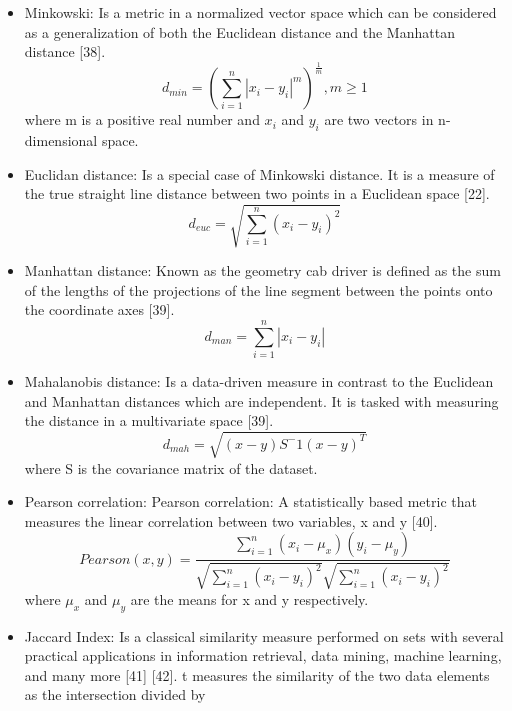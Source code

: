 \documentclass[
]{article}
\providecommand{\tightlist}{%
  \setlength{\itemsep}{0pt}\setlength{\parskip}{0pt}}
\begin{document}
\begin{itemize}
\tightlist
\item
  Minkowski: Is a metric in a normalized vector space which can be
  considered as a generalization of both the Euclidean distance and the
  Manhattan distance {[}38{]}. \begin{equation}
        d_{min} = (\sum_{i=1}^{n}|x_i - y_i|^m)^\frac{1}{m}, m\geq 1
    \end{equation} where m is a positive real number and \(x_i\) and
  \(y_i\) are two vectors in n-dimensional space.
\item
  Euclidan distance: Is a special case of Minkowski distance. It is a
  measure of the true straight line distance between two points in a
  Euclidean space {[}22{]}. \begin{equation}
        d_{euc} =  \sqrt{\sum_{i=1}^{n}(x_{i}-y_{i})^2}
    \end{equation}
\item
  Manhattan distance: Known as the geometry cab driver is defined as the
  sum of the lengths of the projections of the line segment between the
  points onto the coordinate axes {[}39{]}. \begin{equation}
        d_{man} =  \sum_{i=1}^{n}|x_{i}-y_{i}|
    \end{equation}
\item
  Mahalanobis distance: Is a data-driven measure in contrast to the
  Euclidean and Manhattan distances which are independent. It is tasked
  with measuring the distance in a multivariate space {[}39{]}.
  \begin{equation}
        d_{mah}= \sqrt{(x-y)S^-1(x-y)^T}
    \end{equation} where S is the covariance matrix of the dataset.
\item
  Pearson correlation: Pearson correlation: A statistically based metric
  that measures the linear correlation between two variables, x and y
  {[}40{]}. \begin{equation}
        Pearson(x,y)= \frac{\sum_{i=1}^n(x_i-\mu_x)(y_i-\mu_y)}{\sqrt{\sum_{i=1}^n(x_i-y_i)^2}\sqrt{\sum_{i=1}^n(x_i-y_i)^2}}
    \end{equation} where \(\mu_x\) and \(\mu_y\) are the means for x and
  y respectively.
\item
  Jaccard Index: Is a classical similarity measure performed on sets
  with several practical applications in information retrieval, data
  mining, machine learning, and many more {[}41{]} {[}42{]}. t measures
  the similarity of the two data elements as the intersection divided by

\end{itemize}
\end{document}
